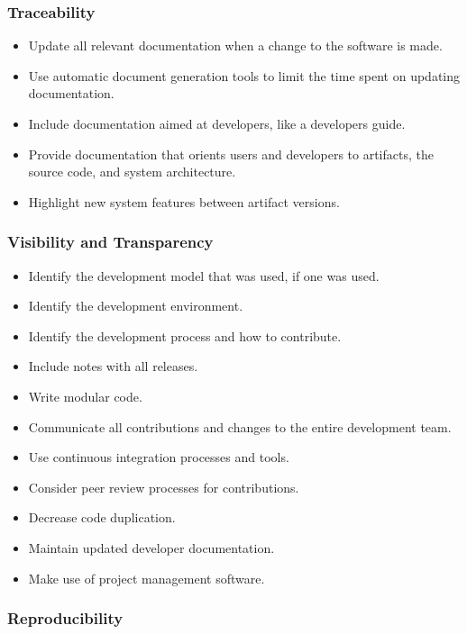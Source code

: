 \documentclass[12pt, notitlepage]{article}
\begin{document}
\subsubsection{Traceability}

\begin{itemize}
	\item Update all relevant documentation when a change to the software is made.
	\item Use automatic document generation tools to limit the time spent on updating documentation.
	\item Include documentation aimed at developers, like a developers guide.
	\item Provide documentation that orients users and developers to artifacts, the source code, and system architecture.
	\item Highlight new system features between artifact versions. 
\end{itemize}

\subsubsection{Visibility and Transparency}

\begin{itemize}
	\item Identify the development model that was used, if one was used.
	\item Identify the development environment.
	\item Identify the development process and how to contribute. 
	\item Include notes with all releases.
	\item Write modular code.
	\item Communicate all contributions and changes to the entire development team.
	\item Use continuous integration processes and tools.
	\item Consider peer review processes for contributions. 
	\item Decrease code duplication.
	\item Maintain updated developer documentation.
	\item Make use of project management software.
\end{itemize}

\subsubsection{Reproducibility}
\end{document}
